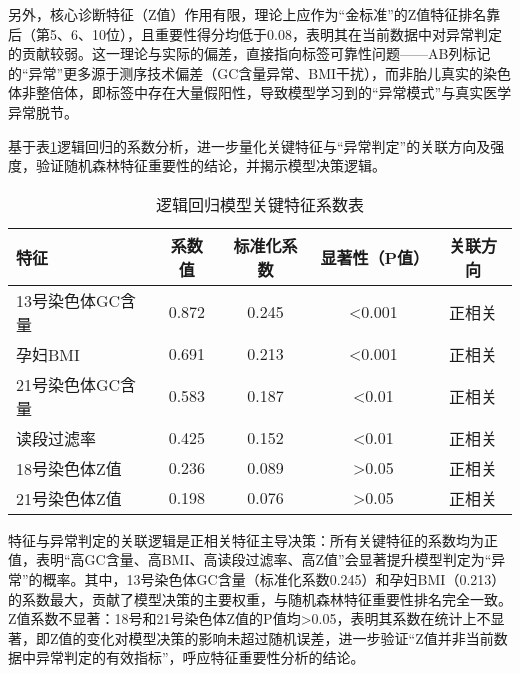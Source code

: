 \documentclass[withoutpreface,bwprint]{cumcmthesis} %
\begin{document}
另外，核心诊断特征（Z值）作用有限，理论上应作为“金标准”的Z值特征排名靠后（第5、6、10位），且重要性得分均低于0.08，表明其在当前数据中对异常判定的贡献较弱。这一理论与实际的偏差，直接指向标签可靠性问题——AB列标记的“异常”更多源于测序技术偏差（GC含量异常、BMI干扰），而非胎儿真实的染色体非整倍体，即标签中存在大量假阳性，导致模型学习到的“异常模式”与真实医学异常脱节。

基于表\ref{tab:逻辑回归模型关键特征系数表}逻辑回归的系数分析，进一步量化关键特征与“异常判定”的关联方向及强度，验证随机森林特征重要性的结论，并揭示模型决策逻辑。


\begin{table}[H]
    \centering  %
    \caption{逻辑回归模型关键特征系数表}  %
    \label{tab:逻辑回归模型关键特征系数表}  %
    \begin{threeparttable}
        \begin{tabularx}{0.88\textwidth}{l c c c c}
            \toprule[1.5pt]
            \textbf{特征} & \textbf{系数值} & \textbf{标准化系数} & \textbf{显著性（P值）} & \textbf{关联方向} \\ 
            \midrule[1pt]
            13号染色体GC含量    & 0.872    & 0.245      & <0.001        & 正相关   \\
            孕妇BMI             & 0.691    & 0.213      & <0.001        & 正相关   \\
            21号染色体GC含量    & 0.583    & 0.187      & <0.01         & 正相关   \\
            读段过滤率          & 0.425    & 0.152      & <0.01         & 正相关   \\
            18号染色体Z值       & 0.236    & 0.089      & >0.05         & 正相关   \\
            21号染色体Z值       & 0.198    & 0.076      & >0.05         & 正相关   \\

            \bottomrule[1.5pt]
        \end{tabularx}
    \end{threeparttable}
\end{table}

特征与异常判定的关联逻辑是正相关特征主导决策：所有关键特征的系数均为正值，表明“高GC含量、高BMI、高读段过滤率、高Z值”会显著提升模型判定为“异常”的概率。其中，13号染色体GC含量（标准化系数0.245）和孕妇BMI（0.213）的系数最大，贡献了模型决策的主要权重，与随机森林特征重要性排名完全一致。Z值系数不显著：18号和21号染色体Z值的P值均>0.05，表明其系数在统计上不显著，即Z值的变化对模型决策的影响未超过随机误差，进一步验证“Z值并非当前数据中异常判定的有效指标”，呼应特征重要性分析的结论。
\end{document}
